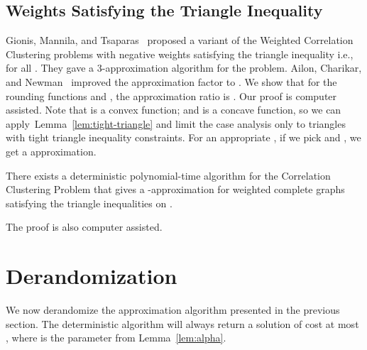 \documentclass[11pt]{article}
\theoremstyle{definition}
\theoremstyle{remark}
\begin{document}
\subsection{Weights Satisfying the Triangle Inequality}\label{sec:triangle-inequalities}
Gionis, Mannila, and Tsaparas~\cite{GMT07} proposed a variant of the Weighted
Correlation Clustering problems with negative weights satisfying the triangle
inequality i.e., 
for all . They gave a 3-approximation algorithm for the problem.
Ailon, Charikar, and Newman~\cite{ACN08} improved the approximation factor to .
We show that for the rounding functions  and ,
the approximation ratio is . Our proof is computer assisted.  Note that
 is a convex function; and  is a concave function, so we can
apply~Lemma~\ref{lem:tight-triangle} and limit the case analysis only to
triangles with tight triangle inequality constraints. For an appropriate ,
if we pick  and , we
get a  approximation.
\begin{theorem}\label{thm:weighted-triang-ineq}
There exists a deterministic polynomial-time algorithm for the Correlation
Clustering Problem that gives a -approximation for weighted complete
graphs satisfying the triangle inequalities on .
\end{theorem}
The proof is also computer assisted.
 \section{Derandomization}\label{sec:derand}
We now derandomize the approximation algorithm presented in the previous section. The deterministic algorithm
will always return a solution of cost at most , where  is the parameter from Lemma~\ref{lem:alpha}.
\end{document}
